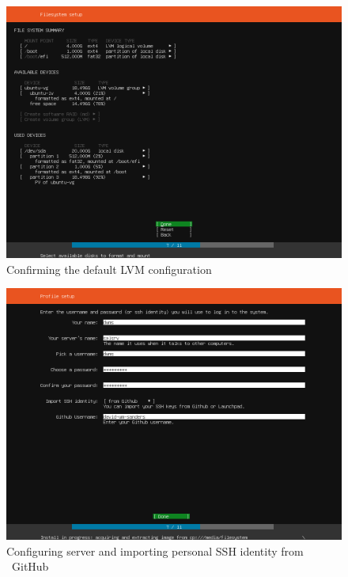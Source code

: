 \pagebreak
\begin{figure}[h!]
\centering
\captionsetup{skip=\skipfigurecaptionlen}
\includegraphics[width=1\textwidth]{screenshots/IY2D502-2019-02-21-19-16-43.png}
\caption{Confirming the default LVM configuration}
\label{fig:IY2D502-2019-02-21-19-16-43}
\end{figure}
\pagebreak
\begin{figure}[h!]
\centering
\captionsetup{skip=\skipfigurecaptionlen}
\includegraphics[width=1\textwidth]{screenshots/IY2D502-2019-02-21-19-17-27.png}
\caption{Configuring server and importing personal SSH identity from \faGithub\ GitHub}
\label{fig:IY2D502-2019-02-21-19-17-27}
\end{figure}
\pagebreak
